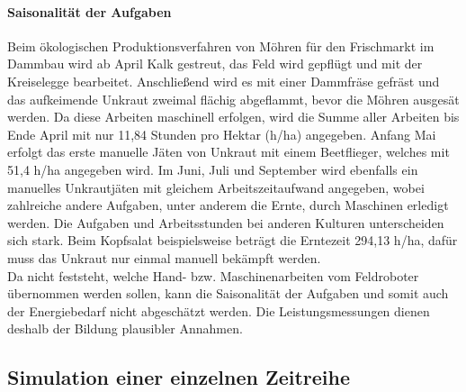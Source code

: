 \paragraph{Saisonalität der Aufgaben} Beim ökologischen Produktionsverfahren von Möhren für den Frischmarkt im Dammbau wird ab April Kalk gestreut, das Feld wird gepflügt und mit der Kreiselegge bearbeitet. Anschließend wird es mit einer Dammfräse gefräst und das aufkeimende Unkraut zweimal flächig abgeflammt, bevor die Möhren ausgesät werden. Da diese Arbeiten maschinell erfolgen, wird die Summe aller Arbeiten bis Ende April mit nur 11,84 Stunden pro Hektar (h/ha) angegeben. Anfang Mai erfolgt das erste manuelle Jäten von Unkraut mit einem Beetflieger, welches mit 51,4 h/ha angegeben wird. Im Juni, Juli und September wird ebenfalls ein manuelles Unkrautjäten mit gleichem Arbeitszeitaufwand angegeben, wobei zahlreiche andere Aufgaben, unter anderem die Ernte, durch Maschinen erledigt werden. Die Aufgaben und Arbeitsstunden bei anderen Kulturen unterscheiden sich stark. Beim Kopfsalat beispielsweise beträgt die Erntezeit 294,13 h/ha, dafür muss das Unkraut nur einmal manuell bekämpft werden. \cite{KTBL2017Gemuesebau} \\

Da nicht feststeht, welche Hand- bzw. Maschinenarbeiten vom Feldroboter übernommen werden sollen, kann die Saisonalität der Aufgaben und somit auch der Energiebedarf nicht abgeschätzt werden. Die Leistungsmessungen dienen deshalb der Bildung plausibler Annahmen.




\subsection{Simulation einer einzelnen Zeitreihe}
